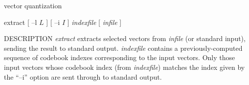 % 
% 
% 
% 
%                                                                        
%
\hypertarget{extract}{}
%
{vector quantization}

\begin{synopsis}
\item [extract] [ --l $L$ ] [ --i $I$ ]  {\em indexfile}  [ {\em infile} ] 
\end{synopsis}

\begin{qsection}{DESCRIPTION}
{\em extract} extracts selected vectors 
from {\em infile} (or standard input), 
sending the result to standard output. 
{\em indexfile} contains a previously-computed sequence of 
codebook indexes corresponding to the input vectors.  
Only those input vectors whose codebook index (from {\em indexfile}) 
matches the index given by the ``--i'' option 
are sent through to standard output.
\end{qsection}

